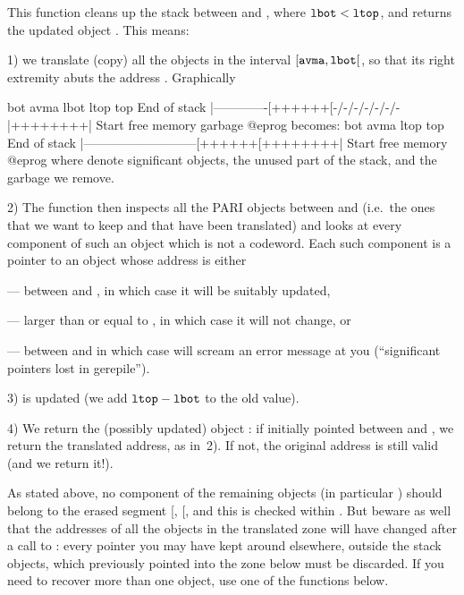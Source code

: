 \noindent
This function cleans up the stack between  and , where
${\tt lbot} < {\tt ltop}$, and returns the updated object . This means:

1) we translate (copy) all the objects in the interval
$[{\tt avma}, {\tt lbot}[$, so that its right extremity abuts the address
. Graphically

\vbox{\bprog
             bot           avma   lbot          ltop     top
End of stack  |-------------[++++++[-/-/-/-/-/-/-|++++++++|  Start
                free memory            garbage
@eprog
\noindent becomes:
\bprog
             bot                         avma   ltop     top
End of stack  |---------------------------[++++++[++++++++|  Start
                       free memory
@eprog
}
\noindent where \kbd{++} denote significant objects, \kbd{--} the unused part
of the stack, and \kbd{-/-} the garbage we remove.

2) The function then inspects all the PARI objects between  and
 (i.e.~the ones that we want to keep and that have been translated)
and looks at every component of such an object which is not a codeword. Each
such component is a pointer to an object whose address is either

--- between  and , in which case it will be suitably
updated,

--- larger than or equal to , in which case it will not change, or

--- between  and  in which case  will
scream an error message at you (``significant pointers lost in gerepile'').

3)  is updated (we add ${\tt ltop} - {\tt lbot}$ to the old value).

4) We return the (possibly updated) object : if  initially
pointed between  and , we return the translated
address, as in~2). If not, the original address is still valid (and we return
it!).

As stated above, no component of the remaining objects (in particular
) should belong to the erased segment [, [, and
this is checked within . But beware as well that the addresses
of all the objects in the translated zone will have changed after a call to
: every pointer you may have kept around elsewhere, outside the
stack objects, which previously pointed into the zone below 
must be discarded. If you need to recover more than one object, use one of
the  functions below.

